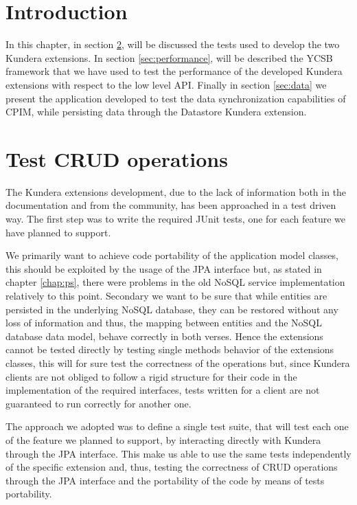 \section{Introduction}
In this chapter, in section \ref{sec:crud}, will be discussed the tests used to develop the two Kundera extensions.
In section \ref{sec:performance}, will be described the YCSB framework that we have used to test the performance of the developed Kundera extensions with respect to the low level API.
Finally in section \ref{sec:data} we present the application developed to test the data synchronization capabilities of CPIM, while persisting data through the Datastore Kundera extension. 

\section{Test CRUD operations}
\label{sec:crud}
The Kundera extensions development, due to the lack of information both in the documentation and from the community, has been approached in a test driven way.
The first step was to write the required JUnit tests, one for each feature we have planned to support.

\newparagraph We primarily want to achieve code portability of the application model classes, this should be exploited by the usage of the JPA interface but, as stated in chapter \ref{chap:ps}, there were problems in the old NoSQL service implementation relatively to this point.
Secondary we want to be sure that while entities are persisted in the underlying NoSQL database, they can be restored without any loss of information and thus, the mapping between entities and the NoSQL database data model, behave correctly in both verses.
Hence the extensions cannot be tested directly by testing single methods behavior of the extensions classes, this will for sure test the correctness of the operations but, since Kundera clients are not obliged to follow a rigid structure for their code in the implementation of the required interfaces, tests written for a client are not guaranteed to run correctly for another one. 

\noindent The approach we adopted was to define a single test suite, that will test each one of the feature we planned to support, by interacting directly with Kundera through the JPA interface. This make us able to use the same tests independently of the specific extension and, thus, testing the correctness of CRUD operations through the JPA interface and the portability of the code by means of tests portability.

